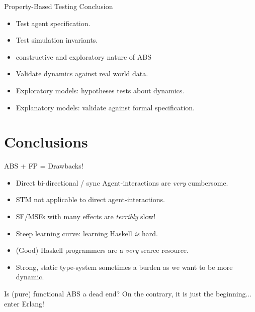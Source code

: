 \documentclass{beamer} %
\begin{document}
\begin{frame}{Property-Based Testing Conclusion}
  \begin{itemize}
    \item Test agent specification.
    \item Test simulation invariants.
    \item constructive and exploratory nature of ABS
    \item Validate dynamics against real world data.
    \item Exploratory models: hypotheses tests about dynamics.
    \item Explanatory models: validate against formal specification.
  \end{itemize}
\end{frame}

\section{Conclusions}

\begin{frame}{ABS + FP = Drawbacks!}
  \begin{itemize}
    \item Direct bi-directional / sync Agent-interactions are \textit{very} cumbersome.
    \item STM not applicable to direct agent-interactions.
    \item SF/MSFs with many effects are \textit{terribly} slow!
    \item Steep learning curve: learning Haskell \textit{is} hard.
    \item (Good) Haskell programmers are a \textit{very} scarce resource.
    \item Strong, static type-system sometimes a burden as we want to be more dynamic.
  \end{itemize}
  
  \begin{block}{Is (pure) functional ABS a dead end?}
    On the contrary, it is just the beginning... enter Erlang!
  \end{block}
\end{frame}
\end{document}
